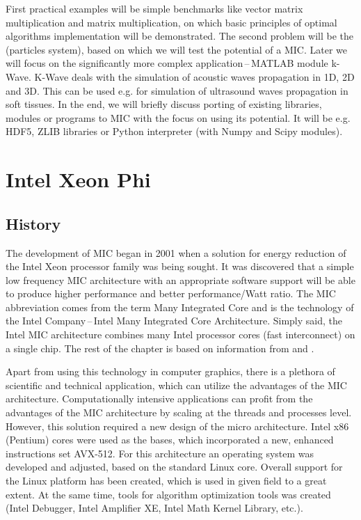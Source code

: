\par First practical examples will be simple benchmarks like vector matrix multiplication and matrix multiplication, on which basic principles of optimal algorithms implementation will be demonstrated. The second problem will be the  (particles system), based on which we will test the potential of a MIC. Later we will focus on the significantly more complex application\,--\,MATLAB module k-Wave. K-Wave deals with the simulation of acoustic waves propagation in 1D, 2D and 3D. This can be used e.g. for simulation of ultrasound waves propagation in soft tissues. In the end, we will briefly discuss porting of existing libraries, modules or programs to MIC with the focus on using its potential. It will be e.g. HDF5, ZLIB libraries or Python interpreter (with Numpy and Scipy modules).

\chapter{Intel Xeon Phi}

\section{History}
The development of MIC began in 2001 when a solution for energy reduction of the Intel Xeon processor family was being sought. It was discovered that a simple low frequency MIC architecture with an appropriate software support will be able to produce higher performance and better performance/Watt ratio. The MIC abbreviation comes from the term Many Integrated Core and is the technology of the Intel Company\,--\,Intel Many Integrated Core Architecture. Simply said, the Intel MIC architecture combines many Intel processor cores (fast interconnect) on a single chip. The rest of the chapter is based on information from \cite{xeon_phi_book} and \cite{intel_phi_architecture}. 

\par Apart from using this technology in computer graphics, there is a plethora of scientific and technical application, which can utilize the advantages of the MIC architecture. Computationally intensive applications can profit from the advantages of the MIC architecture by scaling at the threads and processes level. However, this solution required a new design of the micro architecture. Intel x86 (Pentium) cores were used as the bases, which incorporated a new, enhanced instructions set AVX-512. For this architecture an operating system was developed and adjusted, based on the standard Linux core. Overall support for the Linux platform has been created, which is used in given field to a great extent. At the same time, tools for algorithm optimization tools was created (Intel Debugger, Intel Amplifier XE, Intel Math Kernel Library, etc.).

